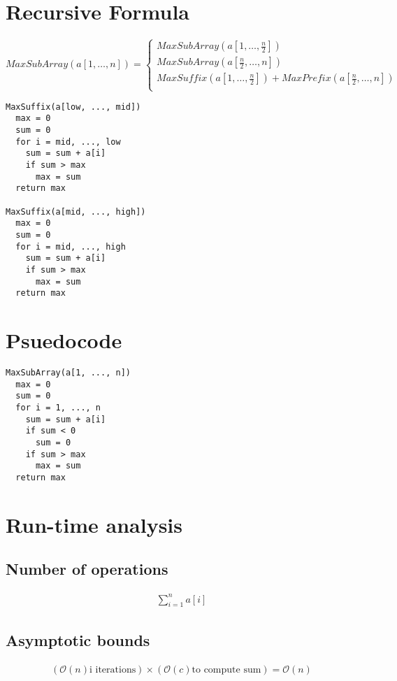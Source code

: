 \documentclass{article}
\begin{document}
\section*{Recursive Formula}

\[
  MaxSubArray(a[1, \ldots, n]) =
  \begin{cases}
      MaxSubArray\left(a[1, \ldots, \frac{n}{2}]\right)\\
      MaxSubArray\left(a[\frac{n}{2}, \ldots, n]\right)\\
      MaxSuffix\left(a[1, \ldots, \frac{n}{2}]\right) +
      MaxPrefix\left(a[\frac{n}{2}, \ldots, n]\right)\\
  \end{cases}
\]

\begin{verbatim}
MaxSuffix(a[low, ..., mid])
  max = 0
  sum = 0
  for i = mid, ..., low
    sum = sum + a[i]
    if sum > max
      max = sum
  return max

MaxSuffix(a[mid, ..., high])
  max = 0
  sum = 0
  for i = mid, ..., high
    sum = sum + a[i]
    if sum > max
      max = sum
  return max
\end{verbatim}

\section*{Psuedocode}

\begin{verbatim}
MaxSubArray(a[1, ..., n])
  max = 0
  sum = 0
  for i = 1, ..., n
    sum = sum + a[i]
    if sum < 0
      sum = 0
    if sum > max
      max = sum
  return max
\end{verbatim}

\section*{Run-time analysis}

\subsection*{Number of operations}
\begin{eqnarray*}
  \sum_{i=1}^{n}a[i]
\end{eqnarray*}

\subsection*{Asymptotic bounds}
\begin{eqnarray*}
    (\mathcal{O}(n) \text{i iterations}) \times
    (\mathcal{O}(c) \text{to compute sum}) = \mathcal{O}(n)
\end{eqnarray*}
\end{document}
